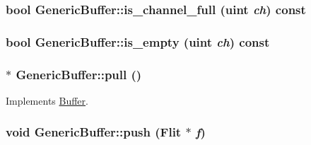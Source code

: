 \hypertarget{classGenericBuffer_91aa6e2af039aa6c1a50a599fc3f3203}{
\subsubsection[{is\_\-channel\_\-full}]{\setlength{\rightskip}{0pt plus 5cm}bool GenericBuffer::is\_\-channel\_\-full ({\bf uint} {\em ch}) const}}
\label{classGenericBuffer_91aa6e2af039aa6c1a50a599fc3f3203}


\hypertarget{classGenericBuffer_94742936925e0b4873dd270aed2c326d}{
\subsubsection[{is\_\-empty}]{\setlength{\rightskip}{0pt plus 5cm}bool GenericBuffer::is\_\-empty ({\bf uint} {\em ch}) const}}
\label{classGenericBuffer_94742936925e0b4873dd270aed2c326d}


\hypertarget{classGenericBuffer_6ce6f151eb6f65ec1fffafffb04a8f0e}{
\subsubsection[{pull}]{ $\ast$ GenericBuffer::pull ()}}
\label{classGenericBuffer_6ce6f151eb6f65ec1fffafffb04a8f0e}




Implements \hyperlink{classBuffer_95f5c230f9c261bc13ddcfafcc340e7e}{Buffer}.\hypertarget{classGenericBuffer_c5a0781106485f9567898b49021f6346}{
\subsubsection[{push}]{\setlength{\rightskip}{0pt plus 5cm}void GenericBuffer::push ({\bf Flit} $\ast$ {\em f})}}
\label{classGenericBuffer_c5a0781106485f9567898b49021f6346}




